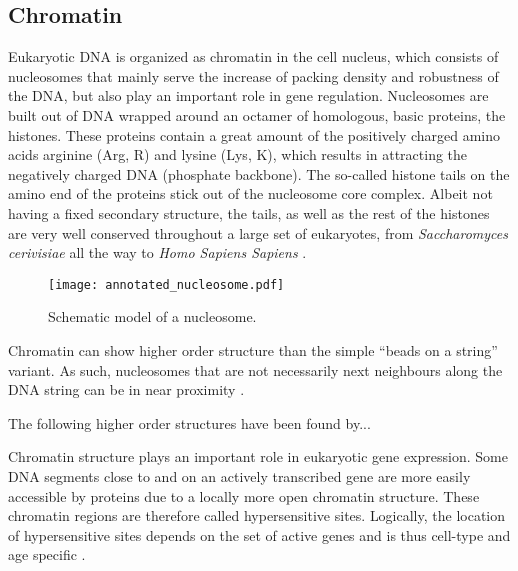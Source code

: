         \subsection{Chromatin}
            Eukaryotic DNA is organized as chromatin in the cell nucleus, which consists of nucleosomes that mainly serve the increase of packing density and robustness of the DNA, but also play an important role in gene regulation. Nucleosomes are built out of DNA wrapped around an octamer of homologous, basic proteins, the histones. These proteins contain a great amount of the positively charged amino acids arginine (Arg, R) and lysine (Lys, K), which results in attracting the negatively charged DNA (phosphate backbone). The so-called histone tails on the amino end of the proteins stick out of the nucleosome core complex. Albeit not having a fixed secondary structure, the tails, as well as the rest of the histones are very well conserved throughout a large set of eukaryotes, from \textit{Saccharomyces cerivisiae} all the way to \textit{Homo Sapiens Sapiens} \cite{berg2015stryer}. %

            \begin{figure}[htpb!]
                \centering
                \texttt{[image: annotated\_nucleosome.pdf]}
                \caption{Schematic model of a nucleosome.} %
                \label{img:nucleosome}
            \end{figure}

            Chromatin can show higher order structure than the simple “beads on a string” variant. As such, nucleosomes that are not necessarily next neighbours along the DNA string can be in near proximity \cite{berg2015stryer}. %

            \begin{itemize}
                {
                    \color{red}
                    \item The following higher order structures have been found by...
                }
            \end{itemize}
            Chromatin structure plays an important role in eukaryotic gene expression. Some DNA segments close to and on an actively transcribed gene are more easily accessible by proteins due to a locally more open chromatin structure. These chromatin regions are therefore called hypersensitive sites. \cite{cooper2017genome} Logically, the location of hypersensitive sites depends on the set of active genes and is thus cell-type and age specific \cite{berg2015stryer}.

